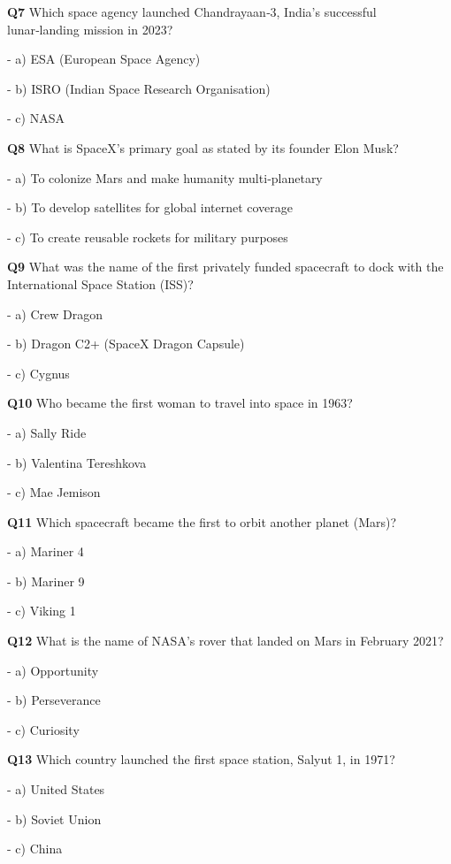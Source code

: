 \textbf{Q7} Which space agency launched Chandrayaan‑3, India's successful lunar‑landing mission in 2023?\par
\quad - a) ESA (European Space Agency)\par
\quad - b) ISRO (Indian Space Research Organisation)\par
\quad - c) NASA\par

\textbf{Q8} What is SpaceX's primary goal as stated by its founder Elon Musk?\par
\quad - a) To colonize Mars and make humanity multi‑planetary\par
\quad - b) To develop satellites for global internet coverage\par
\quad - c) To create reusable rockets for military purposes\par

\textbf{Q9} What was the name of the first privately funded spacecraft to dock with the International Space Station (ISS)?\par
\quad - a) Crew Dragon\par
\quad - b) Dragon C2+ (SpaceX Dragon Capsule)\par
\quad - c) Cygnus\par

\textbf{Q10} Who became the first woman to travel into space in 1963?\par
\quad - a) Sally Ride\par
\quad - b) Valentina Tereshkova\par
\quad - c) Mae Jemison\par

\textbf{Q11} Which spacecraft became the first to orbit another planet (Mars)?\par
\quad - a) Mariner 4\par
\quad - b) Mariner 9\par
\quad - c) Viking 1\par

\textbf{Q12} What is the name of NASA's rover that landed on Mars in February 2021?\par
\quad - a) Opportunity\par
\quad - b) Perseverance\par
\quad - c) Curiosity\par

\textbf{Q13} Which country launched the first space station, Salyut 1, in 1971?\par
\quad - a) United States\par
\quad - b) Soviet Union\par
\quad - c) China\par

